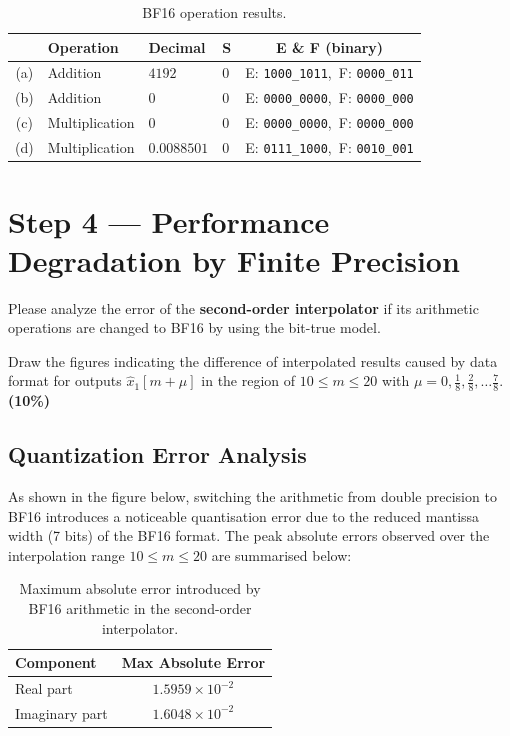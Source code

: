 \documentclass[12pt,a4paper]{report}
\begin{document}
\begin{table}[H]
    \centering
    \renewcommand{\arraystretch}{1.3}
    \begin{tabular}{clllc}
        \toprule
        & \textbf{Operation} & \textbf{Decimal} & \textbf{S} & \textbf{E \& F (binary)} \\
        \midrule
        (a) & Addition       & $4192$      & 0 & E: \texttt{1000\_1011},\ F: \texttt{0000\_011} \\
        (b) & Addition       & $0$         & 0 & E: \texttt{0000\_0000},\ F: \texttt{0000\_000} \\
        (c) & Multiplication & $0$         & 0 & E: \texttt{0000\_0000},\ F: \texttt{0000\_000} \\
        (d) & Multiplication & $0.0088501$ & 0 & E: \texttt{0111\_1000},\ F: \texttt{0010\_001} \\
        \bottomrule
    \end{tabular}
    \caption{BF16 operation results.}
    \label{tab:bf16-results}
\end{table}

\newpage

\chapter{Step 4 — Performance Degradation by Finite Precision}

Please analyze the error of the \textbf{second-order interpolator} if its arithmetic
operations are changed to BF16 by using the bit-true model.

Draw the figures indicating the difference of interpolated results caused by data
format for outputs $\hat{x}_1[m+\mu]$ in the region of $10 \le m \le 20$
with $\mu = 0,\tfrac{1}{8},\tfrac{2}{8},\ldots\tfrac{7}{8}$.
\textbf{(10\%)}

\section{Quantization Error Analysis}
As shown in the figure below, switching the arithmetic from double precision to
BF16 introduces a noticeable quantisation error due to the reduced mantissa
width (7 bits) of the BF16 format.  The peak absolute errors observed over the
interpolation range $10 \le m \le 20$ are summarised below:

\begin{table}[H]
    \centering
    \renewcommand{\arraystretch}{1.3}
    \begin{tabular}{lc}
        \toprule
        \textbf{Component} & \textbf{Max Absolute Error} \\
        \midrule
        Real part & $1.5959 \times 10^{-2}$ \\
        Imaginary part & $1.6048 \times 10^{-2}$ \\
        \bottomrule
    \end{tabular}
    \caption{Maximum absolute error introduced by BF16 arithmetic in the second-order interpolator.}
    \label{tab:bf16-error}
\end{table}
\end{document}
